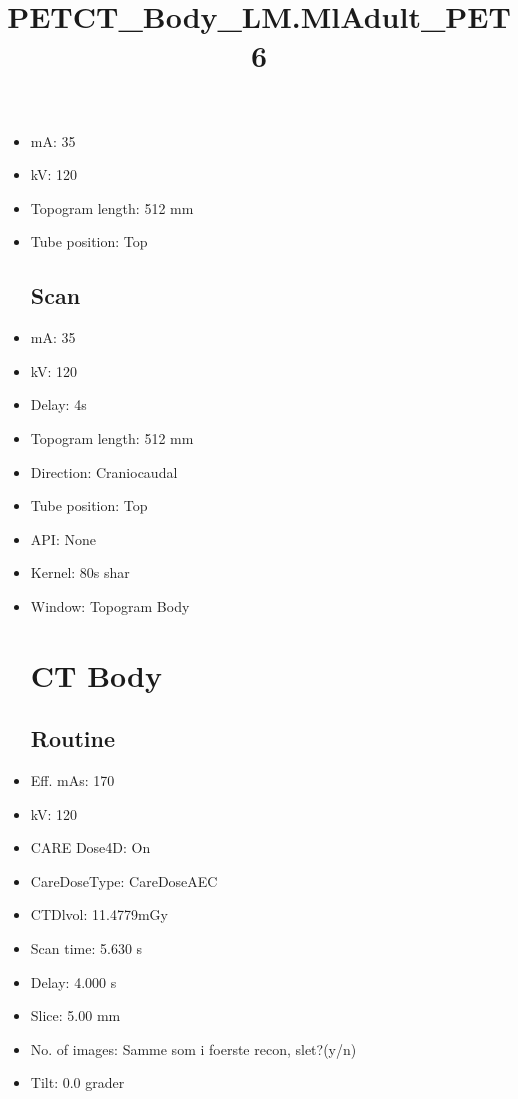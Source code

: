 \documentclass[12pt]{article}
\title{PETCT\_Body\_LM.MlAdult\_PET6}
\begin{document}
\maketitle
\newpage
\tableofcontents
\newpage
{}


\begin{itemize}[noitemsep]\section{Topogram}
\subsection{Routine}
\item mA: 35\item kV: 120\item Topogram length: 512 mm\item Tube position: Top
\subsection{Scan}\item mA: 35\item kV: 120\item Delay: 4s\item Topogram length: 512 mm\item Direction: Craniocaudal\item Tube position: Top\item API: None\item Kernel: 80s shar\item Window: Topogram Body
\section{CT Body}
\subsection{Routine}
\item Eff. mAs: 170\item kV: 120\item CARE Dose4D: On\item CareDoseType: CareDoseAEC\item CTDlvol: 11.4779mGy\item Scan time: 5.630 s\item Delay: 4.000 s\item Slice: 5.00 mm\item No. of images: Samme som i foerste recon, slet?(y/n)\item Tilt: 0.0 grader

\end{itemize}
\end{document}
